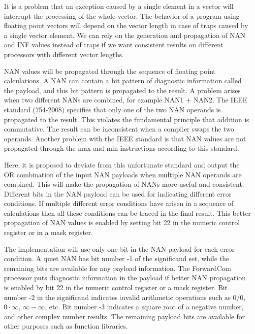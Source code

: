 \documentclass[forwardcom.tex]{subfiles}
\begin{document}
It is a problem that an exception caused by a single element in a vector will interrupt the processing of the whole vector. The behavior of a program using floating point vectors will depend on the vector length in case of traps caused by a single vector element. We can rely on the generation and propagation of NAN and INF values instead of traps if we want consistent results on different processors with different vector lengths. 
\vspace{2mm}

\label{nanPropagation}
NAN values will be propagated through the sequence of floating point calculations. A NAN can contain a bit pattern of diagnostic information called the payload, and this bit pattern is propagated to the result. A problem arises when two different NANs are combined, for example NAN1 + NAN2. The IEEE standard (754-2008) specifies that only one of the two NAN operands is propagated to the result. This violates the fundamental principle that addition is commutative. The result can be inconsistent when a compiler swaps the two operands. Another problem with the IEEE standard is that NAN values are not propagated through the max and min instructions according to this standard.
\vspace{2mm}

Here, it is proposed to deviate from this unfortunate standard and output the OR combination of the input NAN payloads when multiple NAN operands are combined. This will make the propagation of NANs more useful and consistent. Different bits in the NAN payload can be used for indicating different error conditions. If multiple different error conditions have arisen in a sequence of calculations then all these conditions can be traced in the final result. This better propagation of NAN values is enabled by setting bit 22 in the numeric control register or in a mask register.
\vspace{2mm}

The implementation will use only one bit in the NAN payload for each error condition. A quiet NAN has bit number -1 of the significand set, while the remaining bits are available for any payload information. The ForwardCom processor puts diagnostic information in the payload if better NAN propagation is enabled by bit 22 in the numeric control register or a mask register. Bit number -2 in the significand indicates invalid arithmetic operations such as 0/0, $0\cdot\infty$, $\infty-\infty$, etc. Bit number -3 indicates a square root of a negative number, and other complex number results. The remaining payload bits are available for other purposes such as function libraries.
\vspace{2mm}
\end{document}
